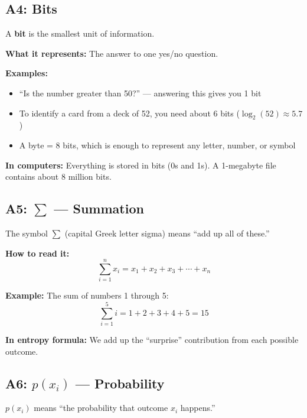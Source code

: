 \documentclass[11pt,a4paper]{article}
\begin{document}
\subsection*{A4: Bits}
\label{A4}

A \textbf{bit} is the smallest unit of information.

\textbf{What it represents:} The answer to one yes/no question.

\textbf{Examples:}
\begin{itemize}
    \item ``Is the number greater than 50?'' --- answering this gives you 1 bit
    \item To identify a card from a deck of 52, you need about 6 bits ($\log_2(52) \approx 5.7$)
    \item A byte = 8 bits, which is enough to represent any letter, number, or symbol
\end{itemize}

\textbf{In computers:} Everything is stored in bits (0s and 1s). A 1-megabyte file contains about 8 million bits.

\subsection*{A5: $\sum$ --- Summation}
\label{A5}

The symbol $\sum$ (capital Greek letter sigma) means ``add up all of these.''

\textbf{How to read it:}
\[
\sum_{i=1}^{n} x_i = x_1 + x_2 + x_3 + \cdots + x_n
\]

\textbf{Example:} The sum of numbers 1 through 5:
\[
\sum_{i=1}^{5} i = 1 + 2 + 3 + 4 + 5 = 15
\]

\textbf{In entropy formula:} We add up the ``surprise'' contribution from each possible outcome.

\subsection*{A6: $p(x_i)$ --- Probability}
\label{A6}

$p(x_i)$ means ``the probability that outcome $x_i$ happens.''
\end{document}
